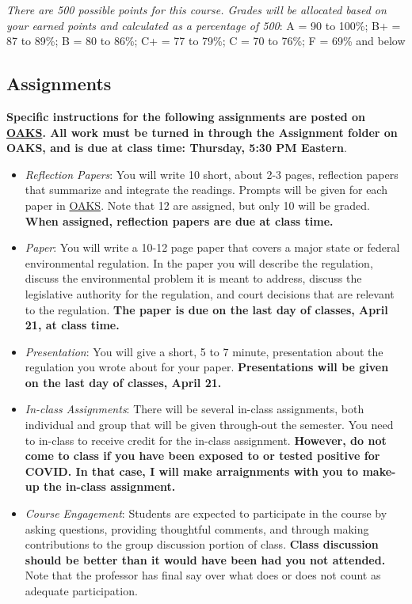 \vspace{0.10in}

\noindent \emph{There are 500 possible points for this course. Grades
will be allocated based on your earned points and calculated as a
percentage of 500}: A = 90 to 100\%; B+ = 87 to 89\%; B = 80 to 86\%; C+
= 77 to 79\%; C = 70 to 76\%; F = 69\% and below

\hypertarget{assignments}{%
\subsection{Assignments}\label{assignments}}

\textbf{Specific instructions for the following assignments are posted
on \href{https://lms.cofc.edu/d2l/home}{OAKS}. All work must be turned
in through the Assignment folder on OAKS, and is due at class time:
Thursday, 5:30 PM Eastern}.

\begin{itemize}
\item
  \emph{Reflection Papers}: You will write 10 short, about 2-3 pages,
  reflection papers that summarize and integrate the readings. Prompts
  will be given for each paper in \href{https://lms.cofc.edu}{OAKS}.
  Note that 12 are assigned, but only 10 will be graded. \textbf{When
  assigned, reflection papers are due at class time.}
\item
  \emph{Paper}: You will write a 10-12 page paper that covers a major
  state or federal environmental regulation. In the paper you will
  describe the regulation, discuss the environmental problem it is meant
  to address, discuss the legislative authority for the regulation, and
  court decisions that are relevant to the regulation. \textbf{The paper
  is due on the last day of classes, April 21, at class time.}
\end{itemize}

\begin{itemize}
\item
  \emph{Presentation}: You will give a short, 5 to 7 minute,
  presentation about the regulation you wrote about for your paper.
  \textbf{Presentations will be given on the last day of classes, April
  21.}
\item
  \emph{In-class Assignments}: There will be several in-class
  assignments, both individual and group that will be given through-out
  the semester. You need to in-class to receive credit for the in-class
  assignment. \textbf{However, do not come to class if you have been
  exposed to or tested positive for COVID. In that case, I will make
  arraignments with you to make-up the in-class assignment.}
\item
  \emph{Course Engagement}: Students are expected to participate in the
  course by asking questions, providing thoughtful comments, and through
  making contributions to the group discussion portion of class.
  \textbf{Class discussion should be better than it would have been had
  you not attended.} Note that the professor has final say over what
  does or does not count as adequate participation.
\end{itemize}

